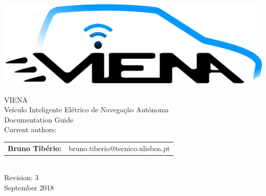 \begin{center}
%
\vspace{3cm}
\includegraphics[width=0.7\linewidth]{figures/VIENA-Logo.eps}

\vspace{1.0cm}
{\FontLb VIENA} \\ {\FontMn Veículo Inteligente Elétrico de Navegação Autónoma}\\ %
\vspace{0.2cm}
{\FontMn Documentation Guide} \\
\vfill
{\FontMb Current authors:}\\
\begin{tabular}{cl}
	\textbf{Bruno Tibério:} & bruno.tiberio@tecnico.ulisboa.pt \hfill         \\
\end{tabular} 
\\
\vfill
{\FontMb Revision: 3}\\
\vspace{0.5cm}
{\FontMb September 2018} \\
%
\end{center}
